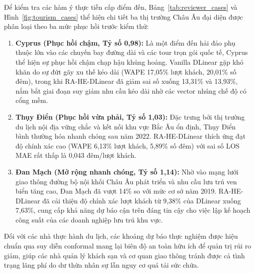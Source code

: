 \documentclass[10pt,journal,compsoc]{IEEEtran}
\begin{document}
Để kiểm tra các hàm ý thực tiễn cấp điểm đến, Bảng~\ref{tab:reviewer_cases} và Hình~\ref{fig:tourism_cases} thể hiện chi tiết ba thị trường Châu Âu đại diện được phân loại theo ba mức phục hồi trước kiểm thử:
\begin{enumerate}\setlength{\itemsep}{1pt}\setlength{\parskip}{0pt}\setlength{\parsep}{0pt}
    \item \textbf{Cyprus (Phục hồi chậm, Tỷ số 0,98):} Là một điểm đến hải đảo phụ thuộc lớn vào các chuyến bay đường dài và các tour trọn gói quốc tế, Cyprus thể hiện sự phục hồi chậm chạp hậu khủng hoảng. Vanilla DLinear gặp khó khăn do sự đứt gãy xu thế kéo dài (WAPE 17,05\% lượt khách, 20,01\% số đêm), trong khi RA-HE-DLinear đã giảm sai số xuống 13,31\% và 13,93\%, nắm bắt giai đoạn suy giảm nhu cầu kéo dài nhờ các vector nhúng chế độ có cổng mềm.
    \item \textbf{Thụy Điển (Phục hồi vừa phải, Tỷ số 1,03):} Đặc trưng bởi thị trường du lịch nội địa vững chắc và kết nối khu vực Bắc Âu ổn định, Thụy Điển bình thường hóa nhanh chóng sau năm 2022. RA-HE-DLinear thích ứng đạt độ chính xác cao (WAPE 6,13\% lượt khách, 5,89\% số đêm) với sai số LOS MAE rất thấp là 0,043 đêm/lượt khách.
    \item \textbf{Đan Mạch (Mở rộng nhanh chóng, Tỷ số 1,14):} Nhờ vào mạng lưới giao thông đường bộ nội khối Châu Âu phát triển và nhu cầu lưu trú ven biển tăng cao, Đan Mạch đã vượt 14\% so với mức cơ sở năm 2019. RA-HE-DLinear đã cải thiện độ chính xác lượt khách từ 9,38\% của DLinear xuống 7,63\%, cung cấp khả năng dự báo cận trên đáng tin cậy cho việc lập kế hoạch công suất của các doanh nghiệp lưu trú khu vực.
\end{enumerate}
Đối với các nhà thực hành du lịch, các khoảng dự báo thực nghiệm được hiệu chuẩn qua suy diễn conformal mang lại biên độ an toàn hữu ích để quản trị rủi ro giảm, giúp các nhà quản lý khách sạn và cơ quan giao thông tránh được cả tình trạng lãng phí do dư thừa nhân sự lẫn nguy cơ quá tải sức chứa.
\end{document}
